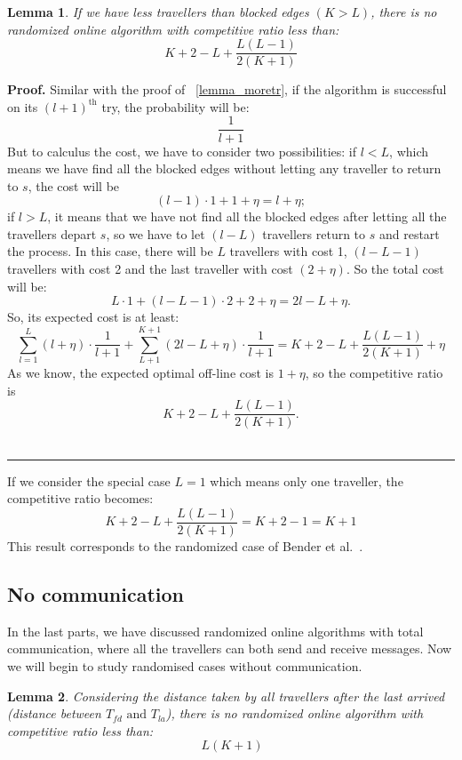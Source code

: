 \documentclass[a4paper, 10pt]{article}
\newtheorem{lemma}{Lemma}
\newenvironment{proof}[1][Proof]{\textbf{#1.} }{\ \rule{0.5em}{0.5em}}
\begin{document}
\begin{lemma}
If we have less travellers than blocked edges $ (K > L )$, there is no randomized online algorithm with competitive ratio less than:
\[
K+2-L+ \frac{L(L-1)}{2(K+1)}
\]
\end{lemma}

\begin{proof}
Similar with the proof of ~\ref{lemma_moretr}, if the algorithm is successful on its $(l+1)^{\text{th}}$ try, the probability will be: 
\[
\frac{1}{l+1}
\]
But to calculus the cost, we have to consider two possibilities: 
if $l < L$, which means we have find all the blocked edges without letting any traveller to return to $s$, the cost will be 
\[
(l-1)\cdot1 + 1 +\eta = l + \eta;
\]
if $l > L$, it means that we have not find all the blocked edges after letting all the travellers depart $s$,  so we have to let $(l-L)$ travellers return to $s$ and restart the process. In this case, there will be $L$ travellers with cost 1, $(l-L-1)$ travellers with cost 2 and the last traveller with cost $(2+\eta)$. So the total cost will be:
\[
L\cdot 1 + (l-L-1)\cdot2 + 2 +\eta = 2l - L + \eta .
\]
So, its expected cost is at least:
\[
\sum_{l=1}^{L}(l+\eta)\cdot \frac{1}{l+1}  +  \sum_{L+1}^{K+1}(2l-L+\eta)\cdot \frac{1}{l+1}
 =K+2-L+ \frac{L(L-1)}{2(K+1)} + \eta
\]
As we know, the expected optimal off-line cost is $1 + \eta$, so the competitive ratio is 
\[
K+2-L+ \frac{L(L-1)}{2(K+1)}.
\]
\end{proof}

If we consider the special case $L=1$ which means only one traveller, the competitive ratio becomes:
\[
K+2-L+ \frac{L(L-1)}{2(K+1)} = K+2-1 = K+1
\]
This result corresponds to the randomized case of Bender et al.~\cite{BeWe15}.

\subsection{No communication}

In the last parts, we have discussed randomized online algorithms with total communication, where all the travellers can both send and receive messages. Now we will begin to study randomised cases without communication. 

\begin{lemma}
Considering the distance taken by all travellers after the last arrived (distance between $T_{fd} \mbox{\ and } T_{la}$), there is no randomized online algorithm with competitive ratio less than:
\[
\ L(K+1)
\]
\end{lemma}
\end{document}
